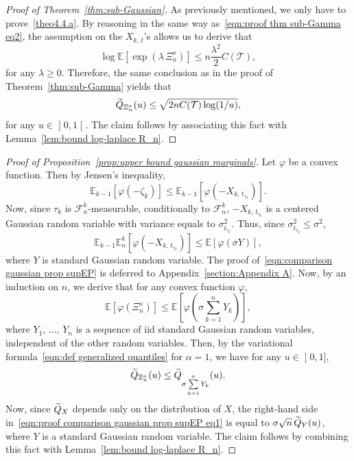 \documentclass[AHL,Unicode,longabstracts,published]{cedram}
\newcommand{\bE}{\mathbb{E}}
\newcommand{\cF}{\mathcal{F}}
\newcommand{\cT}{\mathcal{T}}
\newcommand{\intervalleoo}[2]{\mathopen{]} #1\mathclose{}\mathpunct{},#2\mathclose{[}}
\newcommand{\intervalleof}[2]{\mathopen{]} #1\mathclose{}\mathpunct{},#2\mathclose{]}}
\let\oldtilde\tilde
\renewcommand*{\tilde}[1]{\mathchoice{\widetilde{#1}}{\widetilde{#1}}{\oldtilde{#1}}{\oldtilde{#1}}}
\begin{document}
\begin{proof}[Proof of Theorem~\ref{thm:sub-Gaussian}]
As previously mentioned, we only have to prove~\eqref{theo4.4.a}. By reasoning in the same way as~\eqref{eqn:proof thm sub-Gamma eq2}, the assumption on the $X_{k,\,t}$'s allows us to derive that
\begin{equation}
\log\bE[\exp(\lambda\,\Xi_n^o)]\leq n\frac{\lambda^2}{2}C(\cT),
\end{equation}
for any $\lambda\geq 0$. Therefore, the same conclusion as in the proof of Theorem~\ref{thm:sub-Gamma} yields that
\begin{equation}
\tilde Q_{\Xi_n^o}(u)\leq \sqrt{2nC(\cT)\log(1/u)},
\end{equation}
for any $u\in\intervalleoo 01$. The claim follows by associating this fact with Lemma~\ref{lem:bound log-laplace R_n}.
\end{proof}

\begin{proof}[Proof of Proposition~\ref{prop:upper bound gaussian marginals}]
Let $\varphi$ be a convex function. Then by Jensen's inequality,
\[
\bE_{k-1}\left[\varphi(-\zeta_k)\right]\leq \bE_{k-1}\left[\varphi\left(-X_{k,\,t_{\tau_k}}\right)\right].
\]
Now, since $\tau_k$ is $\cF_n^k$-measurable, conditionally to $\cF_n^k$, $-X_{k,\,t_{\tau_k}}$ is a centered Gaussian random variable with variance equals to $\sigma^2_{t_{\tau_k}}$. Thus, since $\sigma^2_{t_{\tau_k}}\leq \sigma^2$,
\begin{equation}\label{eqn:comparison gaussian prop supEP}
\bE_{k-1}\bE_n^k\left[\varphi\left(-X_{k,\,t_{\tau_k}}\right)\right]\leq \bE[\varphi(\sigma Y)],
\end{equation}
where $Y$ is standard Gaussian random variable. The proof of~\eqref{eqn:comparison gaussian prop supEP} is deferred to Appendix~\ref{section:Appendix A}. Now, by an induction on $n$, we derive that for any convex function $\varphi$,
\begin{equation}
\bE\left[\varphi\left(\Xi_n^o\right)\right]\leq \bE\left[\varphi\left(\sigma\sum_{k=1}^n Y_k\right)\right],
\end{equation}
where $Y_1,\,\ldots,\,Y_n$ is a sequence of iid standard Gaussian random variables, independent of the other random variables. Then, by the variational formula~\eqref{eqn:def generalized quantiles} for $\alpha=1$, we have for any $u\in\intervalleof 01$,
\begin{equation}\label{eqn:proof comparison gaussian prop supEP eq1}
\tilde Q_{\Xi_n^o}(u)\leq \tilde Q_{\sigma\mathop{\sum_{k=1}\limits^n} Y_k}(u).
\end{equation}
Now, since $\tilde Q_X$ depends only on the distribution of $X$, the right-hand side in~\eqref{eqn:proof comparison gaussian prop supEP eq1} is equal to $\sigma\sqrt n\,\tilde Q_Y(u)$, where $Y$ is a standard Gaussian random variable. The claim follows by combining this fact with Lemma~\ref{lem:bound log-laplace R_n}.
\end{proof}
\end{document}
